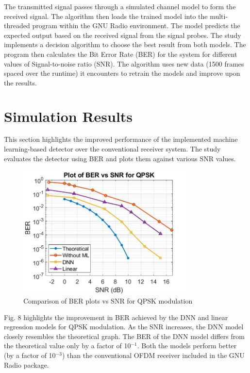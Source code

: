 \documentclass[conference]{IEEEtran}
\begin{document}
The transmitted signal passes through a simulated channel model to form the received signal. The algorithm then loads the trained model into the multi-threaded program within the GNU Radio environment. The model predicts the expected output based on the received signal from the signal probes. The study implements a decision algorithm to choose the best result from both models. The program then calculates the Bit Error Rate (BER) for the system for different values of Signal-to-noise ratio (SNR). The algorithm uses new data (1500 frames spaced over the runtime) it encounters to retrain the models and improve upon the results. 

\section{Simulation Results}
This section highlights the improved performance of the implemented machine learning-based detector over the conventional receiver system. The study evaluates the detector using BER and plots them against various SNR values.


\begin{figure}[htbp]
\centerline{\includegraphics[width=9cm]{ber_plot_qpskv2.jpg}}
\caption{Comparison of BER plots vs SNR for QPSK modulation}
\label{bpsk}
\end{figure}

Fig. 8 highlights the improvement in BER achieved by the DNN and linear regression models for QPSK modulation. As the SNR increases, the DNN model closely resembles the theoretical graph. The BER of the DNN model differs from the theoretical value only by a factor of 10$^{-1}$. Both the models perform better (by a factor of 10$^{-3}$) than the conventional OFDM receiver included in the GNU Radio package.
\end{document}
